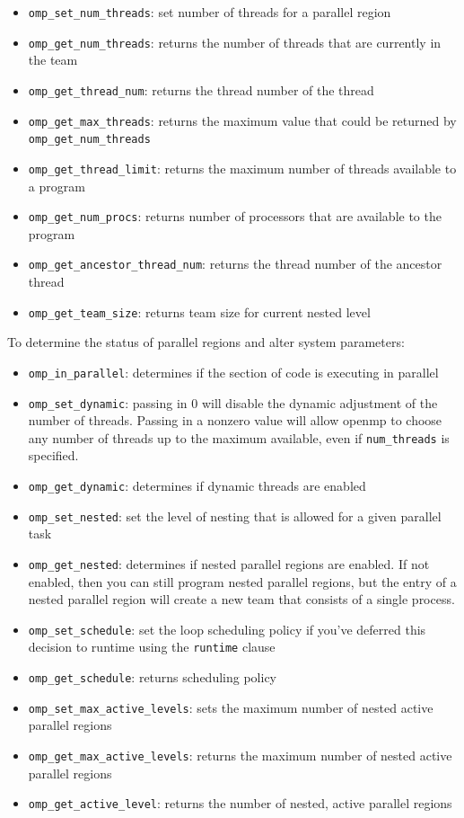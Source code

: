 \documentclass[10pt]{article}
\begin{document}
\begin{flushleft}
\begin{itemize}
\item {\tt omp\_set\_num\_threads}: set number of threads for a parallel region
\item {\tt omp\_get\_num\_threads}: returns the number of threads that are currently in the team
\item {\tt omp\_get\_thread\_num}: returns the thread number of the thread
\item {\tt omp\_get\_max\_threads}: returns the maximum value that could be returned by {\tt omp\_get\_num\_threads}
\item {\tt omp\_get\_thread\_limit}: returns the maximum number of threads available to a program
\item {\tt omp\_get\_num\_procs}: returns number of processors that are available to the program
\item {\tt omp\_get\_ancestor\_thread\_num}: returns the thread number of the ancestor thread
\item {\tt omp\_get\_team\_size}: returns team size for current nested level
\end{itemize}

To determine the status of parallel regions and alter system parameters:

\begin{itemize}
\item {\tt omp\_in\_parallel}: determines if the section of code is executing in parallel
\item {\tt omp\_set\_dynamic}: passing in 0 will disable the dynamic adjustment of the number of threads. Passing in a nonzero value will allow \gls{openmp} to choose any number of threads up to the maximum available, even if {\tt num\_threads} is specified.
\item {\tt omp\_get\_dynamic}: determines if dynamic threads are enabled
\item {\tt omp\_set\_nested}: set the level of nesting that is allowed for a given parallel task
\item {\tt omp\_get\_nested}: determines if nested parallel regions are enabled. If not enabled, then you can still program nested parallel regions, but the entry of a nested parallel region will create a new team that consists of a single process.
\item {\tt omp\_set\_schedule}: set the loop scheduling policy if you've deferred this decision to runtime using the {\tt runtime} clause
\item {\tt omp\_get\_schedule}: returns scheduling policy
\item {\tt omp\_set\_max\_active\_levels}: sets the maximum number of nested active parallel regions
\item {\tt omp\_get\_max\_active\_levels}: returns the maximum number of nested active parallel regions
\item {\tt omp\_get\_active\_level}: returns the number of nested, active parallel regions 
\end{itemize}


\end{flushleft}
\end{document}
